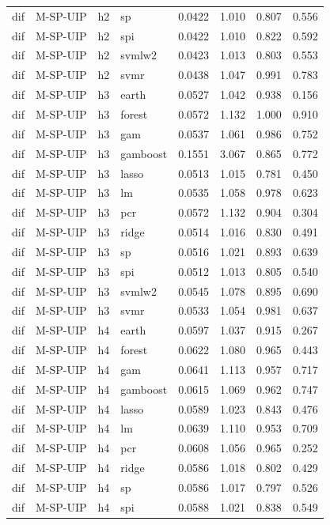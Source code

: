 \begin{ThreePartTable}
\begin{longtable}[t]{llclcccc}
dif & M-SP-UIP & h2 & sp & 0.0422 & 1.010 & 0.807 & 0.556\\
dif & M-SP-UIP & h2 & spi & 0.0422 & 1.010 & 0.822 & 0.592\\
dif & M-SP-UIP & h2 & svmlw2 & 0.0423 & 1.013 & 0.803 & 0.553\\
dif & M-SP-UIP & h2 & svmr & 0.0438 & 1.047 & 0.991 & 0.783\\
\addlinespace
dif & M-SP-UIP & h3 & earth & 0.0527 & 1.042 & 0.938 & 0.156\\
dif & M-SP-UIP & h3 & forest & 0.0572 & 1.132 & 1.000 & 0.910\\
dif & M-SP-UIP & h3 & gam & 0.0537 & 1.061 & 0.986 & 0.752\\
dif & M-SP-UIP & h3 & gamboost & 0.1551 & 3.067 & 0.865 & 0.772\\
dif & M-SP-UIP & h3 & lasso & 0.0513 & 1.015 & 0.781 & 0.450\\
dif & M-SP-UIP & h3 & lm & 0.0535 & 1.058 & 0.978 & 0.623\\
dif & M-SP-UIP & h3 & pcr & 0.0572 & 1.132 & 0.904 & 0.304\\
dif & M-SP-UIP & h3 & ridge & 0.0514 & 1.016 & 0.830 & 0.491\\
dif & M-SP-UIP & h3 & sp & 0.0516 & 1.021 & 0.893 & 0.639\\
dif & M-SP-UIP & h3 & spi & 0.0512 & 1.013 & 0.805 & 0.540\\
dif & M-SP-UIP & h3 & svmlw2 & 0.0545 & 1.078 & 0.895 & 0.690\\
dif & M-SP-UIP & h3 & svmr & 0.0533 & 1.054 & 0.981 & 0.637\\
\addlinespace
dif & M-SP-UIP & h4 & earth & 0.0597 & 1.037 & 0.915 & 0.267\\
dif & M-SP-UIP & h4 & forest & 0.0622 & 1.080 & 0.965 & 0.443\\
dif & M-SP-UIP & h4 & gam & 0.0641 & 1.113 & 0.957 & 0.717\\
dif & M-SP-UIP & h4 & gamboost & 0.0615 & 1.069 & 0.962 & 0.747\\
dif & M-SP-UIP & h4 & lasso & 0.0589 & 1.023 & 0.843 & 0.476\\
dif & M-SP-UIP & h4 & lm & 0.0639 & 1.110 & 0.953 & 0.709\\
dif & M-SP-UIP & h4 & pcr & 0.0608 & 1.056 & 0.965 & 0.252\\
dif & M-SP-UIP & h4 & ridge & 0.0586 & 1.018 & 0.802 & 0.429\\
dif & M-SP-UIP & h4 & sp & 0.0586 & 1.017 & 0.797 & 0.526\\
dif & M-SP-UIP & h4 & spi & 0.0588 & 1.021 & 0.838 & 0.549\\

\end{longtable}
\end{ThreePartTable}
